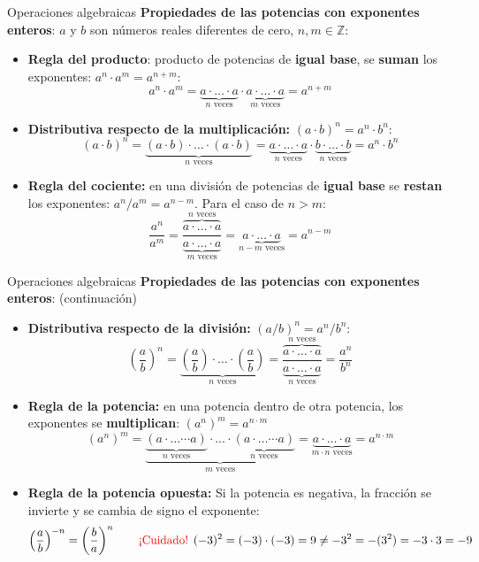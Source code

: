 \documentclass[9pt, aspectratio=169]{beamer}
\begin{document}
\begin{frame}{Operaciones algebraicas}
    \textbf{Propiedades de las potencias con exponentes enteros}: $a$ y $b$ son números reales diferentes de cero, $n, m \in \mathbb{Z}$:
\begin{itemize}
    \item \textbf{Regla del producto}: producto de potencias de \textbf{igual base}, se \textbf{suman} los exponentes: $a^n \cdot a^m = a^{n+m}$:
        \[ a^n \cdot a^m = \underbrace{a \cdot \ldots \cdot a}_{n \text{ veces}} \cdot \underbrace{a \cdot \ldots \cdot a}_{m \text{ veces}} = a^{n+m} \]
    \item \textbf{Distributiva respecto de la multiplicación:} $(a \cdot b)^n = a^n \cdot b^n$:
        \[ (a \cdot b)^n = \underbrace{(a \cdot b) \cdot \ldots \cdot (a \cdot b)}_{n \text{ veces}} = \underbrace{a \cdot \ldots \cdot a}_{n \text{ veces}} \cdot \underbrace{b \cdot \ldots \cdot b}_{n \text{ veces}} = a^n \cdot b^n \]
    \item \textbf{Regla del cociente:} en una división de potencias de \textbf{igual base} se \textbf{restan} los exponentes: $a^n/a^m = a^{n-m}$. Para el caso de $n > m$:
        \[ \frac{a^n}{a^m} = \frac{\overbrace{a \cdot \ldots \cdot a}^{n \text{ veces}}}{\underbrace{a \cdot \ldots \cdot a}_{m \text{ veces}}} = \underbrace{a \cdot \ldots \cdot a}_{n - m \text{ veces}} = a^{n-m}\]
\end{itemize}
\end{frame}


\begin{frame}{Operaciones algebraicas}
    \textbf{Propiedades de las potencias con exponentes enteros}: (continuación)
\begin{itemize}
    \item \textbf{Distributiva respecto de la división:} $(a/b)^n = a^n / b^n$:
        \[ \left(\frac{a}{b}\right)^n = \underbrace{\left(\frac{a}{b}\right) \cdot \ldots \cdot \left(\frac{a}{b}\right)}_{n \text{ veces}}  = \frac{\overbrace{a \cdot \ldots \cdot a}^{n \text{ veces}}}{\underbrace{a \cdot \ldots \cdot a}_{n \text{ veces}}} = \frac{a^n}{b^n} \]
    \item \textbf{Regla de la potencia:} en una potencia dentro de otra potencia, los exponentes se \textbf{multiplican}: $(a^n)^m = a^{n\cdot m}$
        \[ (a^n)^m = \underbrace{\underbrace{(a \cdot \ldots \cdots a)}_{n \text{ veces}} \cdot \ldots \cdot \underbrace{(a \cdot \ldots \cdots a)}_{n \text{ veces}}}_{m \text{ veces}} = \underbrace{a \cdot \ldots \cdot a}_{m \cdot n \text{ veces}} = a^{n \cdot m} \]
    \item \textbf{Regla de la potencia opuesta:} Si la potencia es negativa, la fracción se invierte y se cambia de signo el exponente: 
        \[ \left(\frac{a}{b}\right)^{-n} = \left(\frac{b}{a}\right)^n \qquad \text{\textcolor{red}{¡Cuidado! }} (-3)^2 = (-3)\cdot(-3) = 9 \neq -3^2 = -(3^2) =  -3 \cdot 3 = -9 \]
\end{itemize}
\end{frame}
\end{document}
